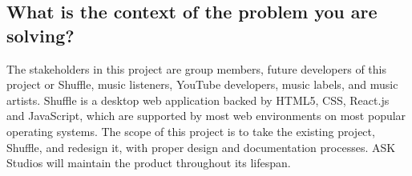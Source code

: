 \documentclass[12pt, a4paper]{article}
\begin{document}
\subsection{What is the context of the problem you are solving?}
The stakeholders in this project are group members, future developers of this project or Shuffle, music listeners, YouTube developers, music labels, and music artists.  Shuffle is a desktop web application backed by HTML5, CSS, React.js and JavaScript, which are supported by most web environments on most popular operating systems.  The scope of this project is to take the existing project, Shuffle, and redesign it, with proper design and documentation processes.  ASK Studios will maintain the product throughout its lifespan.
\end{document}
